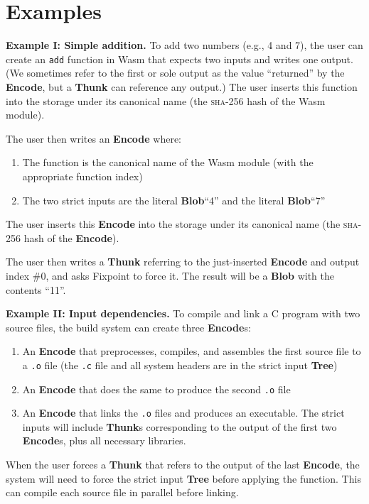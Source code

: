 \documentclass{article}
\newcommand{\blob}{\textbf{Blob}\xspace}
\newcommand{\encode}{\textbf{Encode}\xspace}
\newcommand{\thunk}{\textbf{Thunk}\xspace}
\newcommand{\thunks}{\textbf{Thunk}s\xspace}
\newcommand{\encodes}{\textbf{Encode}s\xspace}
\newcommand{\tree}{\textbf{Tree}\xspace}
\begin{document}
\section{Examples}

\textbf{Example I: Simple addition.} To add two numbers (e.g., 4 and
7), the user can create an \texttt{add} function in Wasm that expects
two inputs and writes one output. (We sometimes refer to the first or
sole output as the value ``returned'' by the \encode, but a \thunk can
reference any output.)  The user inserts this function into the
storage under its canonical name (the \textsc{sha-256} hash of the Wasm
module).

The user then writes an \encode where:
\begin{enumerate}[itemsep=0pt]
\item The function is the canonical name of the Wasm module (with the appropriate function index)
\item The two strict inputs are the literal \blob ``4'' and the literal \blob ``7''
\end{enumerate}
The user inserts this \encode into the storage under its canonical
name (the \textsc{sha-256} hash of the \encode).

The user then writes a \thunk referring to the just-inserted \encode and output index \#0, and asks Fixpoint
to force it. The result will be a \blob with the contents ``11''.

\textbf{Example II: Input dependencies.} To compile and link a C program with two source files,
the build system can create three \encodes:
\begin{enumerate}[itemsep=0pt]
\item An \encode that preprocesses, compiles, and assembles the first source file to a \texttt{.o} file
  (the \texttt{.c} file and all system headers are in the strict input \tree)
\item An \encode that does the same to produce the second \texttt{.o} file
\item An \encode that links the \texttt{.o} files and produces an executable. The strict inputs will include \thunks corresponding to the output of the first two \encodes, plus all necessary libraries.
\end{enumerate}

When the user forces a \thunk that refers to the output of the last \encode, the system will need to force
the strict input \tree before applying the function. This can compile each source file in parallel before linking.
\end{document}
